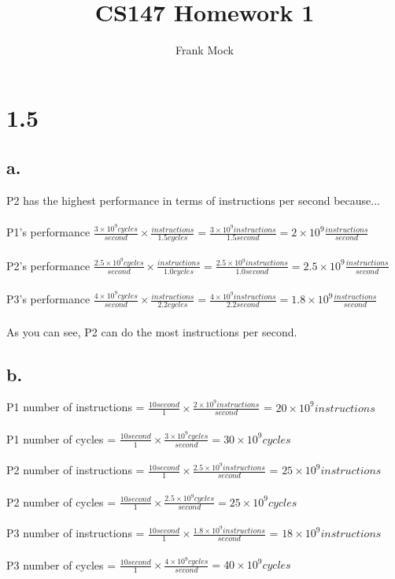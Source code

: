 \documentclass[12pt,letterpaper]{article}
\title{CS147 Homework 1}
\author{Frank Mock}
\begin{document}
\maketitle
\setlength{\parskip}{0pt}
\setlength{\parsep}{0pt}
\setlength{\headsep}{0pt}
\setlength{\topskip}{0pt}
\setlength{\topmargin}{0pt}
\setlength{\topsep}{0pt}
\setlength{\partopsep}{0pt}
\section*{1.5}
\subsection*{a.}
P2 has the highest performance in terms of instructions per second because...\\\\
P1's performance $\frac{3 \times 10^{9} cycles}{second} \times \frac{instructions}{1.5 cycles} = \frac{3 \times 10^{9} instructions}{1.5 second} = 2 \times 10^{9} \frac{instructions}{second}$\\\\
P2's performance $\frac{2.5 \times 10^{9} cycles}{second} \times \frac{instructions}{1.0 cycles} = \frac{2.5 \times 10^{9} instructions}{1.0 second} = 2.5 \times 10^{9} \frac{instructions}{second}$\\\\
P3's performance $\frac{4 \times 10^{9} cycles}{second} \times \frac{instructions}{2.2 cycles} = \frac{4 \times 10^{9} instructions}{2.2 second} = 1.8 \times 10^{9} \frac{instructions}{second}$\\\\
As you can see, P2 can do the most instructions per second.
\subsection*{b.}
P1 number of instructions = $\frac{10 second}{1} \times \frac{2 \times 10^{9} instructions}{second}$ = $20 \times 10^{9} instructions$\\\\
P1 number of cycles = $\frac{10 second}{1} \times \frac{3 \times 10^{9} cycles}{second}= 30 \times 10^{9} cycles$\\\\
P2 number of instructions = $\frac{10 second}{1} \times \frac{2.5 \times 10^{9} instructions}{second}$ = $25 \times 10^{9} instructions$\\\\
P2 number of cycles = $\frac{10 second}{1} \times \frac{2.5 \times 10^{9} cycles}{second}= 25 \times 10^{9} cycles$\\\\
P3 number of instructions = $\frac{10 second}{1} \times \frac{1.8 \times 10^{9} instructions}{second}$ = $18 \times 10^{9} instructions$\\\\
P3 number of cycles = $\frac{10 second}{1} \times \frac{4 \times 10^{9} cycles}{second}= 40 \times 10^{9} cycles$
\end{document}

